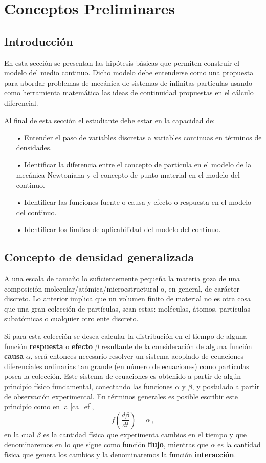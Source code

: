 \documentclass[../notas medios.tex]{subfiles}
\begin{document}
\chapter{Conceptos Preliminares}

\graphicspath{{img/Cap1/}}

\section{Introducción}
En esta sección se presentan las hipótesis básicas que permiten construir el 
modelo del medio continuo. Dicho modelo debe entenderse como una propuesta  
para abordar problemas de mecánica de sistemas de infinitas partículas usando 
como herramienta matemática las ideas de continuidad propuestas en 
el cálculo diferencial.

Al final de esta sección el estudiante debe estar en la capacidad de:
\begin{itemize}
\item[•] Entender el paso de variables discretas a variables continuas en términos de densidades.
\item[•] Identificar la diferencia entre el concepto de partícula en el modelo de la mecánica Newtoniana y el concepto de punto material en el modelo del continuo.
\item[•] Identificar las funciones fuente o causa y efecto o respuesta en el modelo del continuo.
\item[•] Identificar los límites de aplicabilidad del modelo del continuo.
\end{itemize}

\section{Concepto de densidad generalizada}
A una escala de tamaño lo suficientemente pequeña la materia goza de una 
composición molecular/atómica/microestructural o, en general, de carácter 
discreto. Lo anterior implica que un volumen finito de material no es otra cosa 
que una gran colección de partículas, sean estas: moléculas, átomos, partículas 
subatómicas o cualquier otro ente discreto.

Si para esta colección se desea calcular la distribución en el tiempo de alguna función {\bf respuesta} o {\bf efecto} $\beta$ resultante de la consideración de alguna función {\bf causa} $\alpha$, será entonces necesario resolver un sistema acoplado de ecuaciones diferenciales ordinarias tan grande (en número de ecuaciones) como partículas posea la colección. Este sistema de ecuaciones es obtenido a partir de algún principio físico fundamental, conectando las funciones $\alpha$ y $\beta$, y postulado a partir de observación experimental. En términos generales es posible escribir este principio como en la \cref{ca_ef},
\begin{equation}
f\left(\frac{d\beta}{dt} \right) = \alpha\, ,
\label{ca_ef}
\end{equation}
en la cual $\beta$ es la cantidad física que experimenta cambios en el
tiempo y que denominaremos en lo que sigue como función {\bf flujo}, mientras que $\alpha$ es la cantidad física que genera los cambios y la denominaremos la función {\bf interacción}.
\end{document}
